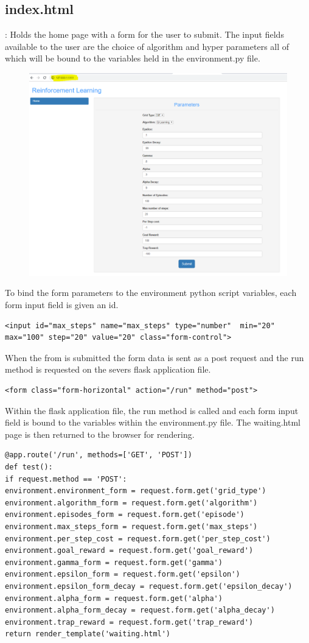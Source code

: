 \subsection{index.html}:
Holds the home page with a form for the user to submit. The input fields available to the user are the choice of algorithm and hyper parameters all of which will be bound to the variables held in the environment.py file.
\begin{figure}[H]
	\centering
	\includegraphics[width=0.7\linewidth]{img/homePage}
	\caption{}
	\label{fig:homepage}
\end{figure}
To bind the form parameters to the environment python script variables, each form input field is given an id.
\begin{verbatim}
<input id="max_steps" name="max_steps" type="number"  min="20"
max="100" step="20" value="20" class="form-control">
\end{verbatim}
When the from is submitted the form data is sent as a post request and the run method is requested on the severs flask application file.
\begin{verbatim}
<form class="form-horizontal" action="/run" method="post">
\end{verbatim}
Within the flask application file, the run method is called and each form input field is bound to the variables within the environment.py file. The waiting.html page is then returned to the browser for rendering.
\begin{verbatim}
@app.route('/run', methods=['GET', 'POST'])
def test():	
if request.method == 'POST':
environment.environment_form = request.form.get('grid_type')
environment.algorithm_form = request.form.get('algorithm')
environment.episodes_form = request.form.get('episode')
environment.max_steps_form = request.form.get('max_steps')
environment.per_step_cost = request.form.get('per_step_cost')
environment.goal_reward = request.form.get('goal_reward')
environment.gamma_form = request.form.get('gamma')
environment.epsilon_form = request.form.get('epsilon')
environment.epsilon_form_decay = request.form.get('epsilon_decay')
environment.alpha_form = request.form.get('alpha')
environment.alpha_form_decay = request.form.get('alpha_decay')
environment.trap_reward = request.form.get('trap_reward')
return render_template('waiting.html')
\end{verbatim}


